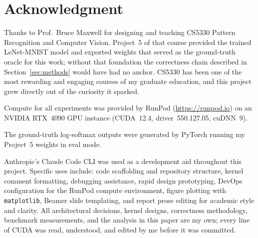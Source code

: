 \documentclass[conference]{IEEEtran}
\begin{document}
\section*{Acknowledgment}
Thanks to Prof.\ Bruce Maxwell for designing and teaching
CS5330 Pattern Recognition and Computer Vision.
Project~5 of that course provided the trained LeNet-MNIST model
and exported weights that served as the ground-truth oracle for
this work; without that foundation the correctness chain described
in Section~\ref{sec:methods} would have had no anchor.
CS5330 has been one of the most rewarding and engaging courses of my graduate
education, and this project grew directly out of the curiosity it
sparked.

Compute for all experiments was provided by RunPod
(\url{https://runpod.io}) on an NVIDIA RTX~4090 GPU instance
(CUDA~12.4, driver~550.127.05, cuDNN~9).

The ground-truth log-softmax outputs were generated by PyTorch
\cite{pytorch2019} running my Project~5 weights in eval mode.

Anthropic's Claude Code CLI was used as a development aid
throughout this project. Specific uses include: code scaffolding
and repository structure, kernel comment formatting, debugging
assistance, rapid design prototyping, DevOps configuration for the
RunPod compute environment, figure plotting with
\texttt{matplotlib}, Beamer slide templating, and report prose
editing for academic style and clarity.
All architectural decisions, kernel designs, correctness
methodology, benchmark measurements, and the analysis in this
paper are my own; every line of CUDA was read, understood, and
edited by me before it was committed.
\end{document}
